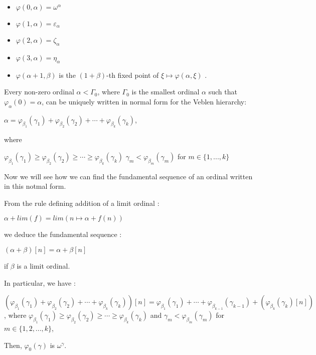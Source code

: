 \documentclass[10pt]{article}
\begin{document}
\begin{itemize}
     \setlength{\itemsep}{1pt}
     \setlength{\parskip}{0pt}
     \setlength{\parsep}{0pt}
\item \( \varphi(0,\alpha) = \omega^\alpha \)
\item \( \varphi(1,\alpha) = \varepsilon_\alpha \)
\item \( \varphi(2,\alpha) = \zeta_\alpha \)
\item \( \varphi(3,\alpha) = \eta_\alpha \)
\item \( \varphi(\alpha+1,\beta) \) is the \( (1+\beta) \)-th fixed point of \( \xi \mapsto \varphi(\alpha,\xi) \) .
\end{itemize}

\bigskip

Every non-zero ordinal \(\alpha<\Gamma_0\), where \(\Gamma_0\) is the smallest ordinal \(\alpha\) such that \(\varphi_\alpha(0)=\alpha\), can be uniquely written in normal form for the Veblen hierarchy:

\(\alpha=\varphi_{\beta_1}(\gamma_1) + \varphi_{\beta_2}(\gamma_2) + \cdots + \varphi_{\beta_k}(\gamma_k)\),

where

\(\varphi_{\beta_1}(\gamma_1) \ge \varphi_{\beta_2}(\gamma_2) \ge \cdots \ge \varphi_{\beta_k}(\gamma_k)\)
\(\gamma_m < \varphi_{\beta_m}(\gamma_m)\) for \(m \in \{1,...,k\}\)

\bigskip

Now we will see how we can find the fundamental sequence of an ordinal written in this notmal form.

From the rule defining addition of a limit ordinal :

\( \alpha + lim(f) = lim (n \mapsto \alpha + f(n)) \)

we deduce the fundamental sequence :

\( (\alpha + \beta)[n] = \alpha + \beta[n] \)

if \( \beta \) is a limit ordinal. 

In particular, we have :

\((\varphi_{\beta_1}(\gamma_1) + \varphi_{\beta_2}(\gamma_2) + \cdots + \varphi_{\beta_k}(\gamma_k))[n]=\varphi_{\beta_1}(\gamma_1) + \cdots + \varphi_{\beta_{k-1}}(\gamma_{k-1}) + (\varphi_{\beta_k}(\gamma_k) [n])\), where \(\varphi_{\beta_1}(\gamma_1) \ge \varphi_{\beta_2}(\gamma_2) \ge \cdots \ge \varphi_{\beta_k}(\gamma_k)\) and \(\gamma_m < \varphi_{\beta_m}(\gamma_m)\) for \(m \in \{1,2,...,k\}\),

Then, \( \varphi_0(\gamma) \) is \( \omega^\gamma \).
\end{document}
